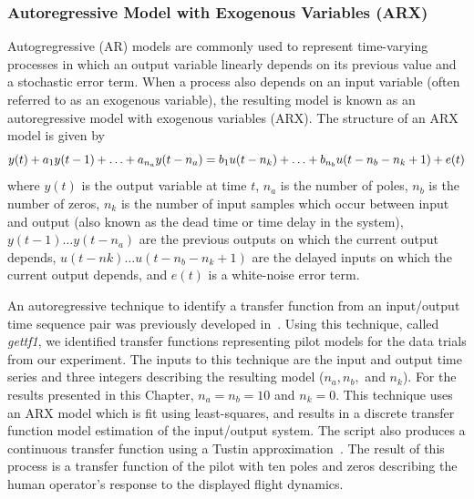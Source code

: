 \subsubsection{Autoregressive Model with Exogenous Variables (ARX)}
Autogregressive (AR) models are commonly used to represent time-varying processes in which an output variable linearly depends on its previous value and a stochastic error term.
When a process also depends on an input variable (often referred to as an exogenous variable), the resulting model is known as an autoregressive model with exogenous variables (ARX).
The structure of an ARX model is given by
\begin{equation}
    y(t) + a_1 y(t-1) + \ldots + a_{n_a} y(t - n_a) = \\
    b_1 u(t-n_k) + \ldots + b_{n_b} u(t-n_b - n_k+1) + e(t)
\end{equation}
where $y(t)$ is the output variable at time $t$, $n_a$ is the number of poles, $n_b$ is the number of zeros, $n_k$ is the number of input samples which occur between input and output (also known as the dead time or time delay in the system), $y(t-1) \ldots y(t-n_a)$ are the previous outputs on which the current output depends, $u(t-nk) \ldots u(t-n_b - n_k+1)$ are the delayed inputs on which the current output depends, and $e(t)$ is a white-noise error term.

An autoregressive technique to identify a transfer function from an input/output time sequence pair was previously developed in~\citet{hess_modeling_2002}.
Using this technique, called \textit{gettf1}, we identified transfer functions representing pilot models for the data trials from our experiment.
The inputs to this technique are the input and output time series and three integers describing the resulting model ($n_a, n_b,$ and $n_k$).
For the results presented in this Chapter, $n_a = n_b = 10$ and $n_k = 0$.
This technique uses an ARX model which is fit using least-squares, and results in a discrete transfer function model estimation of the input/output system.
The script also produces a continuous transfer function using a Tustin approximation~\cite{tustin1947method}.
The result of this process is a transfer function of the pilot with ten poles and zeros describing the human operator's response to the displayed flight dynamics.

